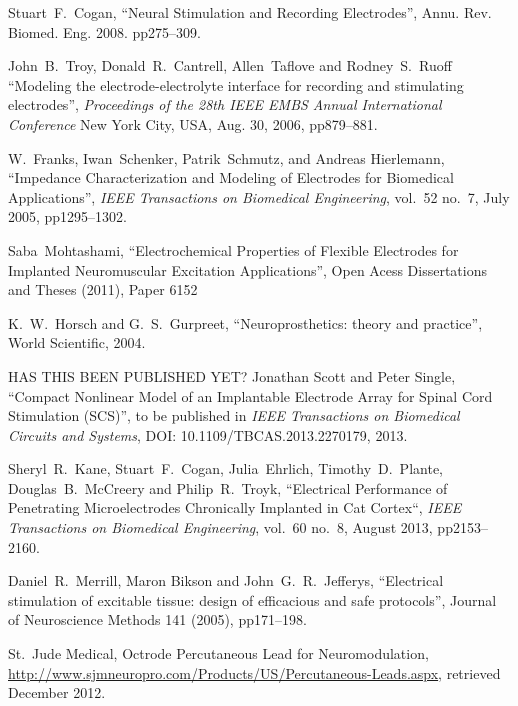 \documentclass[journal, a4paper]{IEEEtran}
\begin{document}
\begin{thebibliography}{99}


    Stuart~F.~Cogan,
    ``Neural Stimulation and Recording Electrodes'',
    Annu. Rev. Biomed. Eng. 2008. pp275--309.

    John~B.~Troy, Donald~R.~Cantrell, Allen~Taflove and Rodney~S.~Ruoff
    ``Modeling the electrode-electrolyte interface for recording and stimulating electrodes'',
    {\em Proceedings of the 28th IEEE EMBS Annual International Conference}
    New York City, USA, Aug. 30, 2006, pp879--881.

    W.~Franks, Iwan~Schenker, Patrik~Schmutz, and Andreas Hierlemann,
    ``Impedance Characterization and Modeling of Electrodes for Biomedical Applications'',
    \emph{IEEE Transactions on Biomedical Engineering},
    vol.~52 no.~7, July 2005, pp1295--1302.

    Saba~Mohtashami,
    ``Electrochemical Properties of Flexible Electrodes for Implanted Neuromuscular Excitation Applications'',
    Open Acess Dissertations and Theses (2011), Paper 6152

    K.~W.~Horsch and G.~S.~Gurpreet,
    ``Neuroprosthetics: theory and practice'',
    World Scientific, 2004.

{\color{red} HAS THIS BEEN PUBLISHED YET?}
    Jonathan Scott and Peter Single,
    ``Compact Nonlinear Model of an Implantable Electrode Array for Spinal Cord Stimulation (SCS)'',
    to be published in
    {\em IEEE Transactions on Biomedical Circuits and Systems},
    DOI: 10.1109/TBCAS.2013.2270179, 2013.

    Sheryl~R.~Kane, Stuart~F.~Cogan, Julia~Ehrlich, Timothy~D.~Plante, Douglas~B.~McCreery and Philip~R.~Troyk,
    ``Electrical Performance of Penetrating Microelectrodes Chronically Implanted in Cat Cortex``,
    {\em IEEE Transactions on Biomedical Engineering},
    vol.~60 no.~8, August 2013, pp2153--2160.

    Daniel~R.~Merrill, Maron Bikson and John~G.~R.\ Jefferys,
    ``Electrical stimulation of excitable tissue: design of efficacious and safe protocols'',
    Journal of Neuroscience Methods 141 (2005), pp171--198.

    St.~Jude Medical, Octrode Percutaneous Lead for Neuromodulation,
    \url{http://www.sjmneuropro.com/Products/US/Percutaneous-Leads.aspx},
    retrieved December 2012.


\end{thebibliography}
\end{document}
